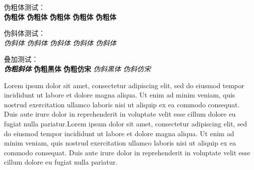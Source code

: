 \documentclass[class = professional, oneside]{gdufe_master_thesis}
\begin{document}
伪粗体测试：\\
{\bfseries\songti 伪粗体} {\bfseries\kaishu 伪粗体} {\bfseries\heiti 伪粗体} {\bfseries\fangsong 伪粗体} {\bfseries 伪粗体}

伪斜体测试：\\
{\itshape\songti 伪斜体} {\itshape\kaishu 伪斜体} {\itshape\heiti 伪斜体} {\itshape\fangsong 伪斜体} {\itshape 伪斜体}

叠加测试：\\
{\bfseries\itshape 伪粗斜体} {\bfseries\sffamily 伪粗黑体} {\bfseries\ttfamily 伪粗仿宋} {\itshape\sffamily 伪斜黑体} {\itshape\ttfamily 伪斜仿宋}

Lorem ipsum dolor sit amet, consectetur adipiscing elit, sed do eiusmod tempor incididunt ut labore et dolore magna aliqua. Ut enim ad minim veniam, quis nostrud exercitation ullamco laboris nisi ut aliquip ex ea commodo consequat. Duis aute irure dolor in reprehenderit in voluptate velit esse cillum dolore eu fugiat nulla pariatur.Lorem ipsum dolor sit amet, consectetur adipiscing elit, sed do eiusmod tempor incididunt ut labore et dolore magna aliqua. Ut enim ad minim veniam, quis nostrud exercitation ullamco laboris nisi ut aliquip ex ea commodo consequat. Duis aute irure dolor in reprehenderit in voluptate velit esse cillum dolore eu fugiat nulla pariatur.

\cleardoublepage
{}
\appendix






\end{document}
